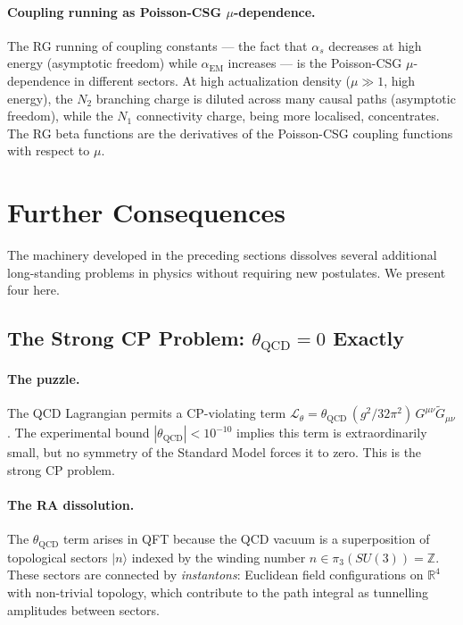\documentclass[11pt,a4paper]{article}
\begin{document}
\paragraph{Coupling running as Poisson-CSG $\mu$-dependence.}
The RG running of coupling constants --- the fact that $\alpha_s$ decreases
at high energy (asymptotic freedom) while $\alpha_{\mathrm{EM}}$ increases ---
is the Poisson-CSG $\mu$-dependence in different sectors. At high
actualization density ($\mu \gg 1$, high energy), the $N_2$ branching charge
is diluted across many causal paths (asymptotic freedom), while the $N_1$
connectivity charge, being more localised, concentrates. The RG beta functions
are the derivatives of the Poisson-CSG coupling functions with respect to $\mu$.


\section{Further Consequences}
\label{sec:consequences}

The machinery developed in the preceding sections dissolves several
additional long-standing problems in physics without requiring new
postulates. We present four here.

\subsection{The Strong CP Problem: $\theta_{\mathrm{QCD}} = 0$ Exactly}
\label{sec:strong_cp}

\paragraph{The puzzle.}
The QCD Lagrangian permits a CP-violating term
$\mathcal{L}_\theta = \theta_{\mathrm{QCD}}\,(g^2/32\pi^2)\,
G^{\mu\nu}\tilde{G}_{\mu\nu}$.
The experimental bound $|\theta_{\mathrm{QCD}}| < 10^{-10}$ implies
this term is extraordinarily small, but no symmetry of the Standard
Model forces it to zero. This is the strong CP problem.

\paragraph{The RA dissolution.}
The $\theta_{\mathrm{QCD}}$ term arises in QFT because the QCD vacuum
is a superposition of topological sectors $|n\rangle$ indexed by the
winding number $n \in \pi_3(SU(3)) = \mathbb{Z}$. These sectors are
connected by \emph{instantons}: Euclidean field configurations on
$\mathbb{R}^4$ with non-trivial topology, which contribute to the
path integral as tunnelling amplitudes between sectors.
\end{document}
